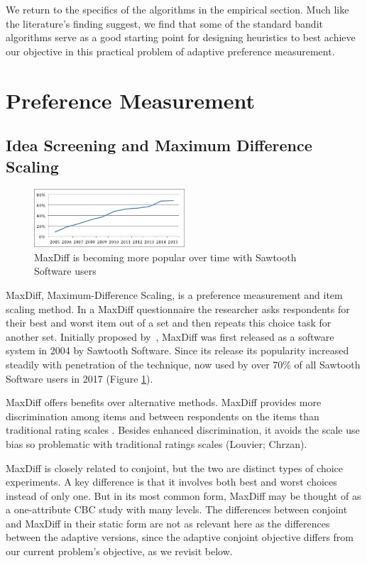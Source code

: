 \documentclass[a4paper,12pt]{article}
\begin{document}
We return to the specifics of the algorithms in the empirical section. Much like the literature's finding suggest, we find that some of the standard bandit algorithms serve as a good starting point for designing heuristics to best achieve our objective in this practical problem of adaptive preference measurement. 



\section{Preference Measurement}
\subsection{Idea Screening and Maximum Difference Scaling}
\begin{figure}
\caption{MaxDiff is becoming more popular over time with Sawtooth Software users} \label{fig:pop}
\begin{center}
\includegraphics[width=0.5\textwidth]{plots/maxdiffpop}
\end{center}
\end{figure}
MaxDiff, Maximum-Difference Scaling, is a preference measurement and item scaling method.  In a MaxDiff questionnaire the researcher asks respondents for their best and worst item out of a set and then repeats this choice task for another set. Initially proposed by~\cite{louviere1991best}, MaxDiff was first released as a software system in 2004 by Sawtooth Software. Since its release its popularity increased steadily with penetration of the technique, now used by over 70\% of all Sawtooth Software users in 2017 (Figure \ref{fig:pop}). 

MaxDiff offers benefits over alternative methods. MaxDiff provides more discrimination among items and between respondents on the items than traditional rating scales \citep{cohen2004s}. Besides enhanced discrimination, it avoids the scale use bias so problematic with traditional ratings scales (Louvier; Chrzan).

MaxDiff is closely related to conjoint, but the two are distinct types of choice experiments. A key difference is that it involves both best and worst choices instead of only one. But in its most common form, MaxDiff may be thought of as a one-attribute CBC study with many levels. The differences between conjoint and MaxDiff in their static form are not as relevant here as the differences between the adaptive versions, since the adaptive conjoint objective differs from our current problem's objective, as we revisit below.
\end{document}
